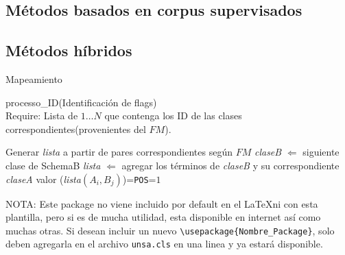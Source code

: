 \subsection{Métodos basados en corpus supervisados}
\subsection{Métodos híbridos}

\bigskip
\begin{algorithm}
\caption{Mapeamiento}\label{mapeadoEVA} processo\_ID(Identificación de flags)\\
Require: Lista de ${1\ldots N}$ que contenga los ID de las clases
correspondientes(provenientes del $FM$).
\begin{algorithmic} [1]
\STATE Generar \emph{lista} a partir de pares correspondientes según
$FM$ 
\STATE
\emph{claseB} $\Longleftarrow$ siguiente clase de SchemaB \STATE
\emph{lista} $\Longleftarrow$ agregar los términos de \emph{claseB}
y su correspondiente \emph{claseA} \STATE valor
(\emph{lista$(A_{i},B_{j})$})=\verb"POS"=$1$ \ENDIF \ENDWHILE
\end{algorithmic}
\end{algorithm}

NOTA: Este package no viene incluido por default en el \LaTeX ni con
esta plantilla, pero si es de mucha utilidad, esta disponible en
internet así como muchas otras. Si desean incluir un nuevo
\verb"\usepackage{Nombre_Package}", solo deben agregarla en el
archivo \verb"unsa.cls" en una linea y ya estará disponible.
